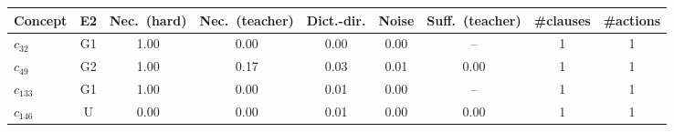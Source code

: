 \begin{tabular}{lcccccccc}
\toprule
Concept & E2 & Nec.\ (hard) & Nec.\ (teacher) & Dict.-dir. & Noise & Suff.\ (teacher) & \#clauses & \#actions \\
\midrule
$c_{32}$ & G1 & 1.00 & 0.00 & 0.00 & 0.00 & -- & 1 & 1 \\
$c_{49}$ & G2 & 1.00 & 0.17 & 0.03 & 0.01 & 0.00 & 1 & 1 \\
$c_{133}$ & G1 & 1.00 & 0.00 & 0.01 & 0.00 & -- & 1 & 1 \\
$c_{146}$ & U & 0.00 & 0.00 & 0.01 & 0.00 & 0.00 & 1 & 1 \\
\bottomrule
\end{tabular}